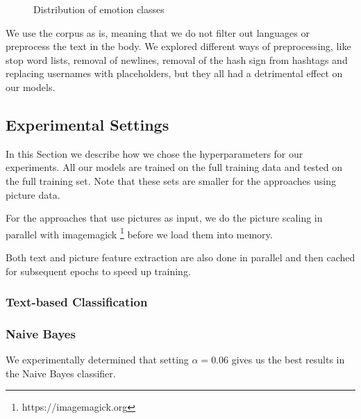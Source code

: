 \documentclass[11pt]{article}
\begin{document}
\begin{figure}
\caption{Distribution of emotion classes}
\label{fig:corpus}
\end{figure}
\begin{center} \end{center}

We use the corpus as is, meaning that we do not filter out languages or
preprocess the text in the body.
We explored different ways of preprocessing, like stop word lists, removal of
newlines, removal of the hash sign from hashtags and replacing usernames with
placeholders, but they all had a detrimental effect on our models.

\subsection{Experimental Settings}
\label{ssec:exsettings}

In this Section we describe how we chose the hyperparameters for our experiments.
All our models are trained on the full training data and tested on the full
training set.
Note that these sets are smaller for the approaches using picture data.

For the approaches that use pictures as input, we do the picture scaling in
parallel with imagemagick \footnote{https://imagemagick.org} before we load them
into memory.

Both text and picture feature extraction are also done in parallel and then
cached for subsequent epochs to speed up training.

\subsubsection{Text-based Classification}

\subsubsection*{Naive Bayes}
We experimentally determined that setting $\alpha=0.06$ gives us the best
results in the Naive Bayes classifier.
\end{document}

